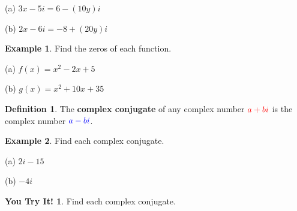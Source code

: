 \documentclass{report}
\theoremstyle{definition}
\newtheorem{example}{\bf Example}
\newtheorem{definition}{\bf Definition}[section]
\newtheorem{youtry}{\textbf{You Try It!}}
\begin{document}
\vspace{-0.25cm}

\begin{minipage}[t]{0.45\linewidth}
(a) $3x-5i=6-(10y)i$
\end{minipage}
\hfill
\begin{minipage}[t]{0.45\linewidth}
(b) $2x-6i=-8+(20y)i$
\end{minipage}

 \newpage

\begin{example}
Find the zeros of each function.
\end{example}

\vspace{-0.25cm}

\begin{minipage}[t]{0.45\linewidth}
(a) $f(x)=x^2-2x+5$
\end{minipage}
\hfill
\begin{minipage}[t]{0.45\linewidth}
(b) $g(x)=x^2+10x+35$
\end{minipage}

\vfill
\vfill

\begin{definition}
The \textbf{complex conjugate} of any complex number $\color{red} a+bi\color{black}$ is the complex number $\color{blue} a-bi \color{black}$.
\end{definition}

\vspace{0.5cm}

\begin{example}
Find each complex conjugate.
\end{example}

\vspace{-0.25cm}

\begin{minipage}[t]{0.45\linewidth}
(a) $2i-15$
\end{minipage}
\hfill
\begin{minipage}[t]{0.45\linewidth}
(b) $-4i$
\end{minipage}

\vfill

\begin{youtry}
Find each complex conjugate.
\end{youtry}

\vspace{-0.25cm}
\end{document}
